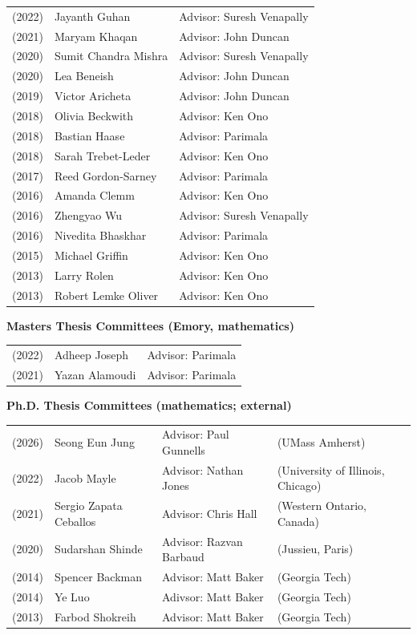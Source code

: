 \documentclass[margin,line]{res}
\begin{document}
\begin{resume}
\begin{tabular}{lll}
(2022) & Jayanth Guhan & Advisor: Suresh Venapally\\    
(2021) & Maryam Khaqan & Advisor: John Duncan\\    
(2020) & Sumit Chandra Mishra & Advisor: Suresh Venapally\\  
(2020) & Lea Beneish & Advisor: John Duncan\\
(2019) & Victor Aricheta & Advisor: John Duncan\\
(2018) & Olivia Beckwith & Advisor: Ken Ono\\
(2018) & Bastian Haase & Advisor: Parimala\\
(2018) & Sarah Trebet-Leder & Advisor: Ken Ono\\
(2017) & Reed Gordon-Sarney & Advisor: Parimala\\
(2016) & Amanda Clemm & Advisor: Ken Ono\\
(2016) & Zhengyao Wu & Advisor: Suresh Venapally\\
(2016) & Nivedita Bhaskhar & Advisor: Parimala\\
(2015) & Michael Griffin & Advisor: Ken Ono\\
(2013) & Larry Rolen & Advisor: Ken Ono\\
(2013) & Robert Lemke Oliver & Advisor: Ken Ono\\
\end{tabular}



{\bf Masters Thesis Committees (Emory, mathematics)}
\vspace*{-.15in}

\begin{tabular}{lll}
  (2022) & Adheep Joseph & Advisor: Parimala\\
  (2021) & Yazan Alamoudi & Advisor: Parimala\\    
\end{tabular}

{\bf Ph.D. Thesis Committees (mathematics; external)}
\vspace*{-.15in}

\begin{tabular}{llll}
(2026) & Seong Eun Jung & Advisor:  Paul Gunnells & (UMass Amherst)\\      
(2022) & Jacob Mayle & Advisor:  Nathan Jones & (University of Illinois, Chicago)\\    
(2021) & Sergio Zapata Ceballos & Advisor:  Chris Hall & (Western Ontario, Canada)\\  
(2020) & Sudarshan Shinde & Advisor:  Razvan Barbaud & (Jussieu, Paris)\\
(2014) & Spencer Backman & Advisor: Matt Baker & (Georgia Tech)\\
(2014) & Ye Luo & Adivsor: Matt Baker & (Georgia Tech)\\
(2013) & Farbod Shokreih &  Advisor: Matt Baker & (Georgia Tech)\\
\end{tabular}


\end{resume}
\end{document}
